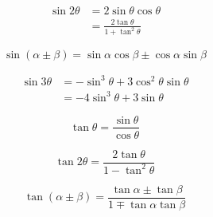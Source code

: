 \[\begin{align} \sin 2\theta &= 2 \sin \theta \cos \theta \\\ &= \frac{2 \tan \theta} {1 + \tan^2 \theta} \end{align}\]

\[\begin{equation} \sin(\alpha \pm \beta) = \sin \alpha \cos \beta \pm \cos \alpha \sin \beta \end{equation}\]

\[\begin{align} \sin 3\theta & = -\sin^3\theta + 3 \cos^2\theta \sin\theta\\\ & = -4\sin^3\theta + 3\sin\theta \end{align}\]

\[\begin{equation} \tan \theta = \frac{\sin \theta}{\cos \theta} \end{equation}\]

\[\begin{equation} \tan 2\theta = \frac{2 \tan \theta} {1 - \tan^2 \theta} \end{equation}\]

\[\begin{equation} \tan(\alpha \pm \beta) = \frac{\tan \alpha \pm \tan \beta}{1 \mp \tan \alpha \tan \beta} \end{equation}\]

